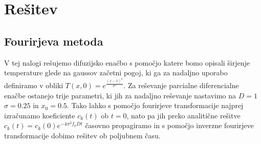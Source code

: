 \documentclass{article}
\begin{document}
\section{Rešitev}
\subsection{Fourirjeva metoda}
V tej nalogi rešujemo difuzijsko enačbo s pomočjo katere bomo opisali širjenje temperature glede na gaussov začetni pogoj, ki ga za nadaljno uporabo definiramo v obliki  $T(x, 0) = e^{\frac{(x-\bar{x})^2}{\sigma^2}}$. Za reševanje parcialne diferencialne enačbe ostanejo trije parametri, ki jih za nadaljno reševanje nastavimo na $D=1$ $\sigma=0.25$ in $x_0=0.5$. Tako lahko s pomočjo fourirjeve transformacije najprej izračunamo koeficiente $c_k(t)$ ob $t=0$, nato pa jih preko analitične rešitve $c_k(t)=c_k(0)e^{-4\pi^2f_k D t}$ časovno propagiramo in s pomočjo inverzne fourirjeve transformacije dobimo rešitev ob poljubnem času. 
\end{document}
